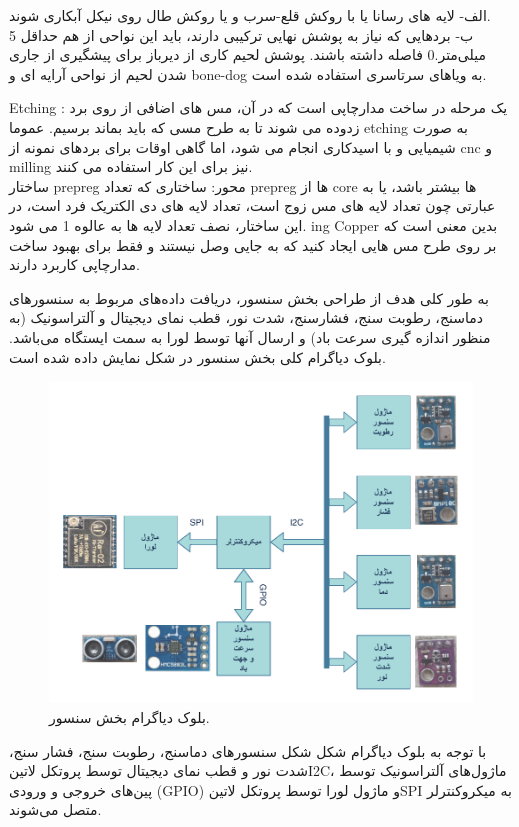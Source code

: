 الف- لایه های رسانا یا با روکش قلع-سرب و یا روکش طال روی نیکل آبکاری شوند.\\
ب- بردهایی که نیاز به پوشش نهایی ترکیبی دارند، باید این نواحی از هم حداقل 5 میلی‌متر.0 فاصله
داشته باشند.
پوشش لحیم کاری از دیرباز برای پیشگیری از جاری شدن لحیم از نواحی آرایه ای و bone-dog به
ویاهای سرتاسری استفاده شده است. 

Etching : یک مرحله در ساخت مدارچاپی است که در آن، مس های اضافی از روی برد زدوده می
شوند تا به طرح مسی که باید بماند برسیم. عموما etching به صورت شیمیایی و با اسیدکاری انجام
می شود، اما گاهی اوقات برای بردهای نمونه از cnc و milling نیز برای این کار استفاده می کنند.\\
ساختار prepreg محور: ساختاری که تعداد prepreg ها از core ها بیشتر باشد، یا به عبارتی چون
تعداد لایه های مس زوج است، تعداد لایه های دی الکتریک فرد است، در این ساختار، نصف
تعداد لایه ها به عالوه 1 می شود.
ing Copper بدین معنی است که بر روی طرح مس هایی ایجاد کنید که به جایی وصل نیستند
و فقط برای بهبود ساخت مدارچاپی کاربرد دارند.


به طور کلی هدف از طراحی بخش سنسور، دریافت داده‌های مربوط به سنسورهای دماسنج، رطوبت سنج، فشارسنج، شدت نور، قطب نمای دیجیتال و آلتراسونیک (به منظور اندازه گیری سرعت باد) و ارسال آنها توسط لورا به سمت ایستگاه می‌‌باشد. بلوک دیاگرام کلی بخش سنسور در شکل  نمایش داده شده است.

\begin{figure}[!h]
	\centering
	\includegraphics[width=0.7\linewidth]{Assets/Diagram.pdf}
	\caption{بلوک دیاگرام بخش سنسور.}
	\label{fig:Diagram}
\end{figure}

\noindent
با توجه به بلوک دیاگرام شکل شکل  سنسورهای دماسنج، رطوبت سنج، فشار سنج، شدت نور و قطب نمای دیجیتال توسط پروتکل ‌لاتین{I2C}، ماژول‌های آلتراسونیک توسط پین‌های خروجی و ورودی (GPIO) و ماژول لورا توسط پروتکل ‌لاتین{SPI} به میکروکنترلر متصل می‌‌شوند.



